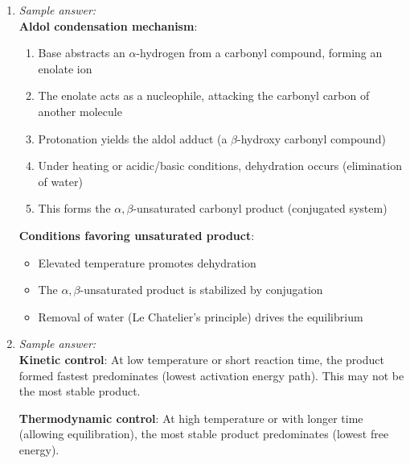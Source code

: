\documentclass[11pt]{article}
\begin{document}
\begin{enumerate}[label=\textbf{\arabic*.}]
  \textbf{Markovnikov's rule}: In the addition of HX to an alkene, the hydrogen adds to the carbon 
  with more hydrogens (less substituted), and X adds to the more substituted carbon. This occurs 
  because:
  \begin{itemize}
    \item The mechanism proceeds through the more stable carbocation intermediate
    \item Addition to the more substituted position forms a more stable carbocation
    \item The reaction follows the pathway with the lowest energy intermediate
  \end{itemize}

  \item \emph{Sample answer:}\\
  \textbf{Aldol condensation mechanism}:
  \begin{enumerate}
    \item Base abstracts an $\alpha$-hydrogen from a carbonyl compound, forming an enolate ion
    \item The enolate acts as a nucleophile, attacking the carbonyl carbon of another molecule
    \item Protonation yields the aldol adduct (a $\beta$-hydroxy carbonyl compound)
    \item Under heating or acidic/basic conditions, dehydration occurs (elimination of water)
    \item This forms the $\alpha,\beta$-unsaturated carbonyl product (conjugated system)
  \end{enumerate}

  \textbf{Conditions favoring unsaturated product}:
  \begin{itemize}
    \item Elevated temperature promotes dehydration
    \item The $\alpha,\beta$-unsaturated product is stabilized by conjugation
    \item Removal of water (Le Chatelier's principle) drives the equilibrium
  \end{itemize}

  \item \emph{Sample answer:}\\
  \textbf{Kinetic control}: At low temperature or short reaction time, the product formed fastest 
  predominates (lowest activation energy path). This may not be the most stable product.

  \textbf{Thermodynamic control}: At high temperature or with longer time (allowing equilibration), 
  the most stable product predominates (lowest free energy).


\end{enumerate}
\end{document}
